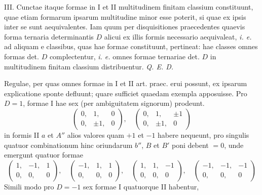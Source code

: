 III. Cunctae itaque formae in I et II multitudinem finitam classium constituunt, quae etiam formarum ipsarum multitudine minor esse poterit, si quae ex ipsis inter se sunt aequivalentes. Iam quum per disquisitiones praecedentes quaevis forma ternaria determinantis \(D\) alicui ex illis formis necessario aequivaleat, \emph{i. e.} ad aliquam e classibus, quas hae formae constituunt, pertineat: hae classes omnes formas det. \(D\) complectentur, \emph{i. e.} omnes formae ternariae det. \(D\) in multitudinem finitam classium distribuentur. \emph{Q. E. D.}

Regulae, per quas omnes formae in I et II art. praec. erui possunt, ex ipsarum explicatione sponte defluunt; quare sufficiet quaedam exempla apposuisse. Pro \(D=1\), formae I hae sex (per ambiguitatem signorum) prodeunt.
\[
\left(\begin{smallmatrix}0,&1,&0\\0,&\pm1,&0\end{smallmatrix}\right),\quad
\left(\begin{smallmatrix}0,&1,&\pm1\\0,&\pm1,&0\end{smallmatrix}\right)
\]
in formis II \(a\) et \(A''\) alios valores quam \(+1\) et \(-1\) habere nequeunt, pro singulis quatuor combinationum hinc oriundarum \(b''\), \(B\) et \(B'\) poni debent \(=0\), unde emergunt quatuor formae
\[
\left(\begin{smallmatrix}1,&-1,&1\\0,&0,&0\end{smallmatrix}\right),\quad
\left(\begin{smallmatrix}-1,&1,&1\\0,&0,&0\end{smallmatrix}\right),\quad
\left(\begin{smallmatrix}1,&1,&-1\\0,&0,&0\end{smallmatrix}\right),\quad
\left(\begin{smallmatrix}-1,&-1,&-1\\0,&0,&0\end{smallmatrix}\right)
\]
Simili modo pro \(D=-1\) sex formae I quatuorque II habentur,
